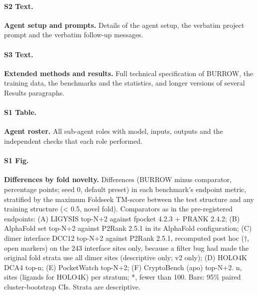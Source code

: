 \documentclass[10pt,letterpaper]{article}
\begin{document}
\paragraph*{S2 Text.}
\label{S2_Text}
{\bf Agent setup and prompts.} Details of the agent setup, the verbatim project prompt and the verbatim follow-up messages.

\paragraph*{S3 Text.}
\label{S3_Text}
{\bf Extended methods and results.} Full technical specification of BURROW, the training data, the benchmarks and the statistics, and longer versions of several Results paragraphs.

\paragraph*{S1 Table.}
\label{S1_Table}
{\bf Agent roster.} All sub-agent roles with model, inputs, outputs and the independent checks that each role performed.

\paragraph*{S1 Fig.}
\label{S1_Fig}
{\bf Differences by fold novelty.} Differences (BURROW minus comparator, percentage points; seed 0, default preset) in each benchmark's endpoint metric, stratified by the maximum Foldseek TM-score between the test structure and any training structure (\textless{} 0.5, novel fold). Comparators as in the pre-registered endpoints: (A) LIGYSIS top-N+2 against fpocket 4.2.3 + PRANK 2.4.2; (B) AlphaFold set top-N+2 against P2Rank 2.5.1 in its AlphaFold configuration; (C) dimer interface DCC12 top-N+2 against P2Rank 2.5.1, recomputed post hoc (†, open markers) on the 243 interface sites only, because a filter bug had made the original fold strata use all dimer sites (descriptive only; v2 only); (D) HOLO4K DCA4 top-n; (E) PocketWatch top-N+2; (F) CryptoBench (apo) top-N+2. n, sites (ligands for HOLO4K) per stratum; *, fewer than 100. Bars: 95\% paired cluster-bootstrap CIs. Strata are descriptive.
\end{document}
